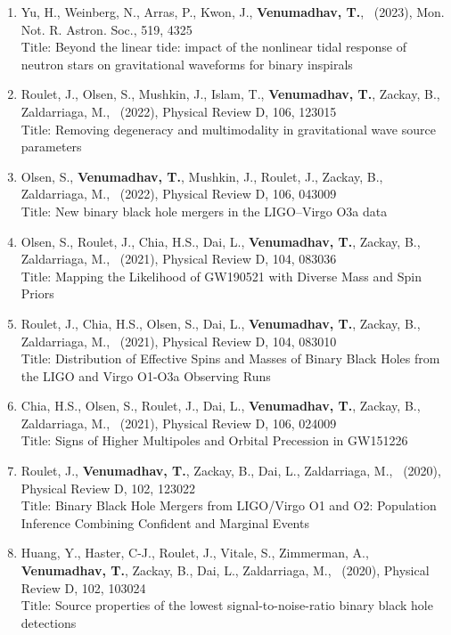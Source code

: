 \documentclass{article}
\newcommand{\mnras}{Mon. Not. R. Astron. Soc.}
\newcommand{\prd}{Physical Review D}
\newlength{\cvindent}
\newenvironment{cvblock}{\noindent\hspace*{\cvindent}\begin{minipage}{\dimexpr\textwidth-\cvindent\relax}}{\end{minipage}\par}
\begin{document}
\begin{cvblock}
\begin{enumerate}
	      Title: Cosmography Using Strongly Lensed Gravitational Waves from Binary Black Holes
	      \item Yu, H., Weinberg, N., Arras, P., Kwon, J., \textbf{Venumadhav, T.}, \ (2023), \mnras, 519, 4325 \\
	      Title: Beyond the linear tide: impact of the nonlinear tidal response of neutron stars on gravitational waveforms for binary inspirals
	      \item Roulet, J., Olsen, S., Mushkin, J., Islam, T., \textbf{Venumadhav, T.}, Zackay, B., Zaldarriaga, M., \ (2022), \prd, 106, 123015 \\
	      Title: Removing degeneracy and multimodality in gravitational wave source parameters
	      \item Olsen, S., \textbf{Venumadhav, T.}, Mushkin, J., Roulet, J., Zackay, B., Zaldarriaga, M., \ (2022), \prd, 106, 043009 \\
	      Title: New binary black hole mergers in the LIGO--Virgo O3a data
	      \item Olsen, S., Roulet, J., Chia, H.S., Dai, L., \textbf{Venumadhav, T.}, Zackay, B., Zaldarriaga, M., \ (2021), \prd, 104, 083036 \\
	      Title: Mapping the Likelihood of GW190521 with Diverse Mass and Spin Priors
	      \item Roulet, J., Chia, H.S., Olsen, S., Dai, L., \textbf{Venumadhav, T.}, Zackay, B., Zaldarriaga, M., \ (2021), \prd, 104, 083010 \\
	      Title: Distribution of Effective Spins and Masses of Binary Black Holes from the LIGO and Virgo O1-O3a Observing Runs
	      \item Chia, H.S., Olsen, S., Roulet, J., Dai, L., \textbf{Venumadhav, T.}, Zackay, B., Zaldarriaga, M., \ (2021), \prd, 106, 024009 \\
	      Title: Signs of Higher Multipoles and Orbital Precession in GW151226
	      \item Roulet, J., \textbf{Venumadhav, T.}, Zackay, B., Dai, L., Zaldarriaga, M., \ (2020), \prd, 102, 123022 \\
	      Title: Binary Black Hole Mergers from LIGO/Virgo O1 and O2: Population Inference Combining Confident and Marginal Events
	      \item Huang, Y., Haster, C-J., Roulet, J., Vitale, S., Zimmerman, A., \textbf{Venumadhav, T.}, Zackay, B., Dai, L., Zaldarriaga, M., \ (2020), \prd, 102, 103024 \\
	      Title: Source properties of the lowest signal-to-noise-ratio binary black hole detections

\end{enumerate}
\end{cvblock}
\end{document}
